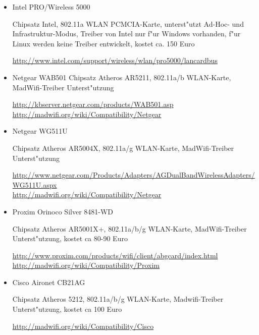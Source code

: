 \begin{itemize}

\item Intel PRO/Wireless 5000

Chipsatz Intel,
802.11a WLAN PCMCIA-Karte, unterst"utzt Ad-Hoc- und Infrastruktur-Modus,
Treiber von Intel nur f"ur Windows vorhanden, f"ur Linux werden keine
Treiber entwickelt, kostet ca. 150 Euro

\url{http://www.intel.com/support/wireless/wlan/pro5000/lancardbus}

\item Netgear WAB501
Chipsatz Atheros AR5211,
802.11a/b WLAN-Karte,
MadWifi-Treiber Unterst"utzung

\url{http://kbserver.netgear.com/products/WAB501.asp}\\
\url{http://madwifi.org/wiki/Compatibility/Netgear}

\item Netgear WG511U

Chipsatz Atheros AR5004X,
802.11a/g WLAN-Karte,
MadWifi-Treiber Unterst"utzung

\url{http://www.netgear.com/Products/Adapters/AGDualBandWirelessAdapters/WG511U.aspx}\\
\url{http://madwifi.org/wiki/Compatibility/Netgear}

\item Proxim Orinoco Silver 8481-WD

Chipsatz Atheros AR5001X+,
802.11a/b/g WLAN-Karte,
MadWifi-Treiber Unterst"utzung,
kostet ca 80-90 Euro

\url{http://www.proxim.com/products/wifi/client/abgcard/index.html}\\
\url{http://madwifi.org/wiki/Compatibility/Proxim}

\item Cisco Aironet CB21AG

Chipsatz Atheros 5212,
802.11a/b/g WLAN-Karte,
Madwifi-Treiber Unterst"utzung,
kostet ca 100 Euro

\url{http://madwifi.org/wiki/Compatibility/Cisco}

\end{itemize}

